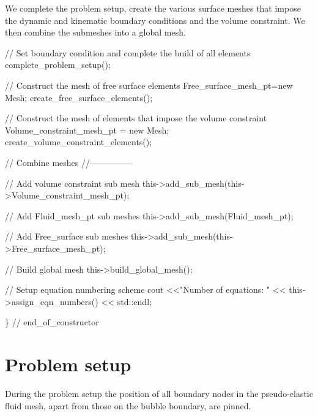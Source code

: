 We complete the problem setup, create the various surface meshes that impose the dynamic and kinematic boundary conditions and the volume constraint. We then combine the submeshes into a global mesh.


\begin{DoxyCodeInclude}
 \textcolor{comment}{// Set boundary condition and complete the build of all elements}
 complete\_problem\_setup();
 
 \textcolor{comment}{// Construct the mesh of free surface elements}
 Free\_surface\_mesh\_pt=\textcolor{keyword}{new} Mesh;
 create\_free\_surface\_elements();

 \textcolor{comment}{// Construct the mesh of elements that impose the volume constraint}
 Volume\_constraint\_mesh\_pt = \textcolor{keyword}{new} Mesh;
 create\_volume\_constraint\_elements();

 \textcolor{comment}{// Combine meshes}
 \textcolor{comment}{//---------------}
 
 \textcolor{comment}{// Add volume constraint sub mesh}
 this->add\_sub\_mesh(this->Volume\_constraint\_mesh\_pt);

 \textcolor{comment}{// Add Fluid\_mesh\_pt sub meshes}
 this->add\_sub\_mesh(Fluid\_mesh\_pt);

 \textcolor{comment}{// Add Free\_surface sub meshes}
 this->add\_sub\_mesh(this->Free\_surface\_mesh\_pt);
 
 \textcolor{comment}{// Build global mesh}
 this->build\_global\_mesh();
  
 \textcolor{comment}{// Setup equation numbering scheme}
 cout <<\textcolor{stringliteral}{"Number of equations: "} << this->assign\_eqn\_numbers() << std::endl;
 
\} \textcolor{comment}{// end\_of\_constructor}

\end{DoxyCodeInclude}




 

\hypertarget{index_problem_setup}{}\section{Problem setup}\label{index_problem_setup}
During the problem setup the position of all boundary nodes in the pseudo-\/elastic fluid mesh, apart from those on the bubble boundary, are pinned.

